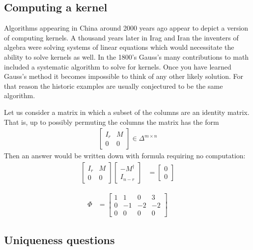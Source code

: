 \documentclass[12pt,twoside,dvipsnames,letterpaper]{memoir}
\begin{document}
\subsection{Computing a kernel}
Algorithms appearing in China around 2000 years
ago appear to depict a version of computing kernels.
A thousand years later in Irag and Iran the inventers of 
algebra were solving systems of linear equations which 
would necessitate the ability to solve kernels as well.
In the 1800's Gauss's many contributions to math included 
a systematic algorithm to solve for kernels.  Once you 
have learned Gauss's method it becomes impossible to think 
of any other likely solution.  For that reason the historic 
examples are usually conjectured to be the same algorithm.

Let us consider a matrix in which a subset of the columns 
are an identity matrix.  That is, up to possibly permuting 
the columns the matrix has the form
\begin{align*}
    \begin{bmatrix}
        I_r & M \\ 
        0 & 0 
    \end{bmatrix}\in \Delta^{m\times n}
\end{align*}
Then an answer would be written down with formula 
requiring no computation:
\begin{align*}
    \begin{bmatrix}
        I_r & M \\ 
        0 & 0 
    \end{bmatrix}
    \begin{bmatrix}
        -M^{\dagger}  \\ 
        I_{n-r} 
    \end{bmatrix}
    & = 
    \begin{bmatrix}
        0\\
        0
    \end{bmatrix}
\end{align*}


\begin{align*}
    \Phi & = 
    \begin{bmatrix}
        1 & 1 & 0 & 3\\
        0 & -1 & -2 & -2\\
        0 & 0 & 0 & 0
    \end{bmatrix}
\end{align*}





\subsection{Uniqueness questions}
\end{document}
